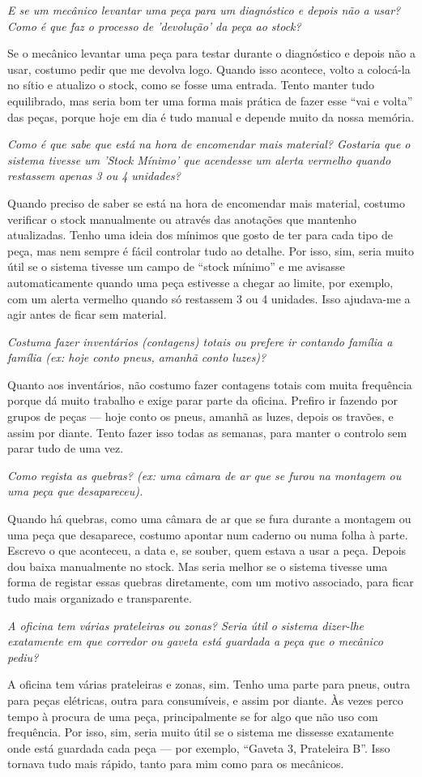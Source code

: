 \documentclass[11pt,a4paper]{article}
\newcommand{\pergunta}[1]{\item[E:] \textit{#1}}
\newcommand{\resposta}[1]{\item[R:] #1}
\begin{document}
\begin{transcription}
		\pergunta{E se um mecânico levantar uma peça para um diagnóstico e depois não a usar? Como é que faz o processo de 'devolução' da peça ao stock?}
		\resposta{Se o mecânico levantar uma peça para testar durante o diagnóstico e depois não a usar, costumo pedir que me devolva logo. Quando isso acontece, volto a colocá-la no sítio e atualizo o stock, como se fosse uma entrada. Tento manter tudo equilibrado, mas seria bom ter uma forma mais prática de fazer esse “vai e volta” das peças, porque hoje em dia é tudo manual e depende muito da nossa memória.}
		
		\pergunta{Como é que sabe que está na hora de encomendar mais material? Gostaria que o sistema tivesse um 'Stock Mínimo' que acendesse um alerta vermelho quando restassem apenas 3 ou 4 unidades?}
		\resposta{Quando preciso de saber se está na hora de encomendar mais material, costumo verificar o stock manualmente ou através das anotações que mantenho atualizadas. Tenho uma ideia dos mínimos que gosto de ter para cada tipo de peça, mas nem sempre é fácil controlar tudo ao detalhe. Por isso, sim, seria muito útil se o sistema tivesse um campo de “stock mínimo” e me avisasse automaticamente quando uma peça estivesse a chegar ao limite, por exemplo, com um alerta vermelho quando só restassem 3 ou 4 unidades. Isso ajudava-me a agir antes de ficar sem material.}
		
		\pergunta{Costuma fazer inventários (contagens) totais ou prefere ir contando família a família (ex: hoje conto pneus, amanhã conto luzes)?}
		\resposta{Quanto aos inventários, não costumo fazer contagens totais com muita frequência porque dá muito trabalho e exige parar parte da oficina. Prefiro ir fazendo por grupos de peças — hoje conto os pneus, amanhã as luzes, depois os travões, e assim por diante. Tento fazer isso todas as semanas, para manter o controlo sem parar tudo de uma vez.}
		
		\pergunta{Como regista as quebras? (ex: uma câmara de ar que se furou na montagem ou uma peça que desapareceu).}
		\resposta{Quando há quebras, como uma câmara de ar que se fura durante a montagem ou uma peça que desaparece, costumo apontar num caderno ou numa folha à parte. Escrevo o que aconteceu, a data e, se souber, quem estava a usar a peça. Depois dou baixa manualmente no stock. Mas seria melhor se o sistema tivesse uma forma de registar essas quebras diretamente, com um motivo associado, para ficar tudo mais organizado e transparente.}
		
		\pergunta{A oficina tem várias prateleiras ou zonas? Seria útil o sistema dizer-lhe exatamente em que corredor ou gaveta está guardada a peça que o mecânico pediu?}
		\resposta{A oficina tem várias prateleiras e zonas, sim. Tenho uma parte para pneus, outra para peças elétricas, outra para consumíveis, e assim por diante. Às vezes perco tempo à procura de uma peça, principalmente se for algo que não uso com frequência. Por isso, sim, seria muito útil se o sistema me dissesse exatamente onde está guardada cada peça — por exemplo, “Gaveta 3, Prateleira B”. Isso tornava tudo mais rápido, tanto para mim como para os mecânicos.}
		

\end{transcription}
\end{document}
